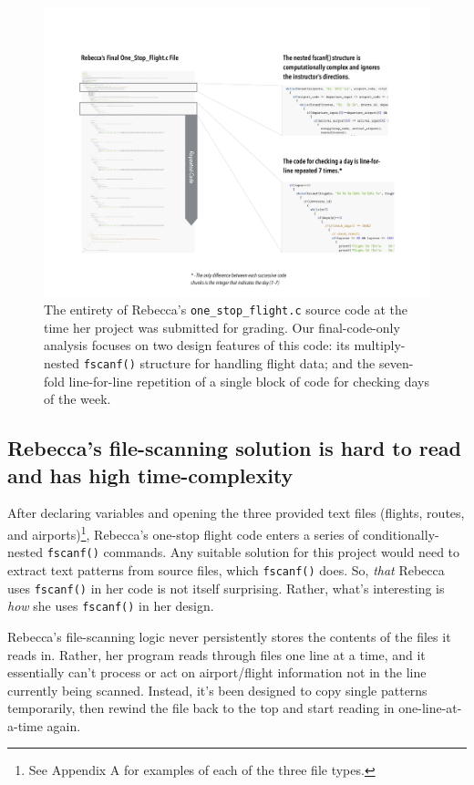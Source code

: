 \begin{figure}[htbp]
\centering
\includegraphics{RebeccasCode/OneStopFlightSupergraphic.pdf}
\caption{The entirety of Rebecca's \texttt{one\_stop\_flight.c} source code at the time her project was submitted for grading. Our final-code-only analysis focuses on two design features of this code: its multiply-nested \texttt{fscanf()} structure for handling flight data; and the seven-fold line-for-line repetition of a single block of code for checking days of the week.}
\end{figure}

\subsection{Rebecca's file-scanning solution is hard to read and has high time-complexity}\label{rebeccas-file-scanning-solution-is-hard-to-read-and-has-high-time-complexity}

After declaring variables and opening the three provided text files (flights, routes, and airports)\footnote{See Appendix A for examples of each of the three file types.}, Rebecca's one-stop flight code enters a series of conditionally-nested \texttt{fscanf()} commands. Any suitable solution for this project would need to extract text patterns from source files, which \texttt{fscanf()} does. So, \emph{that} Rebecca uses \texttt{fscanf()} in her code is not itself surprising. Rather, what's interesting is \emph{how} she uses \texttt{fscanf()} in her design.

Rebecca's file-scanning logic never persistently stores the contents of the files it reads in. Rather, her program reads through files one line at a time, and it essentially can't process or act on airport/flight information not in the line currently being scanned. Instead, it's been designed to copy single patterns temporarily, then rewind the file back to the top and start reading in one-line-at-a-time again.

